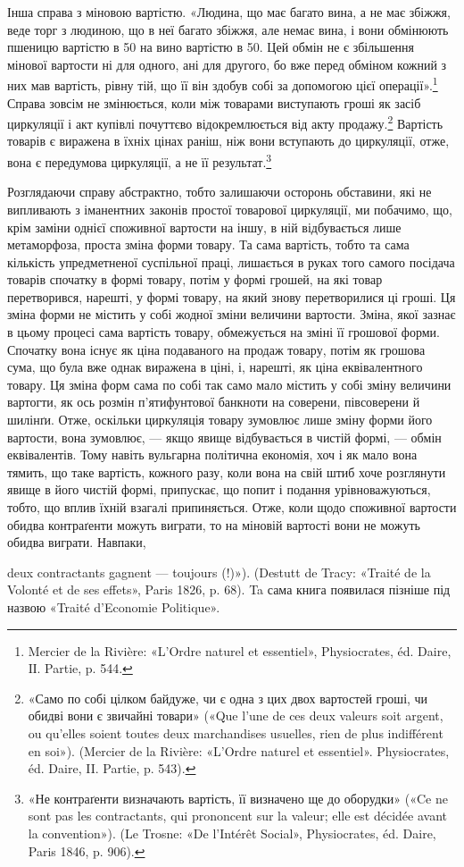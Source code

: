 Інша справа з міновою вартістю. «Людина, що має багато вина,
а не має збіжжя, веде торг з людиною, що в неї багато збіжжя,
але немає вина, і вони обмінюють пшеницю вартістю в 50 на
вино вартістю в 50. Цей обмін не є збільшення мінової вартости
ні для одного, ані для другого, бо вже перед обміном кожний
з них мав вартість, рівну тій, що її він здобув собі за допомогою
цієї операції».\footnote{
Mercier de la Rivière: «L’Ordre naturel et essentiel», Physiocrates, éd.
Daire, IІ. Partie, p. 544.
} Справа зовсім не змінюється, коли між товарами
виступають гроші як засіб циркуляції і акт купівлі почуттєво
відокремлюється від акту продажу.\footnote{
«Само по собі цілком байдуже, чи є одна з цих двох вартостей
гроші, чи обидві вони є звичайні товари» («Que l’une de ces deux valeurs
soit argent, ou qu’elles soient toutes deux marchandises usuelles, rien de
plus indifférent en soi»). (Mercier de la Rivière: «L’Ordre naturel et essentiel».
Physiocrates, éd. Daire, II. Partie, p. 543).
} Вартість товарів є виражена
в їхніх цінах раніш, ніж вони вступають до циркуляції, отже,
вона є передумова циркуляції, а не її результат.\footnote{
«Не контраґенти визначають вартість, її визначено ще до оборудки»
(«Ce ne sont pas les contractants, qui prononcent sur la valeur; elle est
décidée avant la convention»). (Le Trosne: «De l’Intérêt Social», Physiocrates,
éd. Daire, Paris 1846, p. 906).
}

Розглядаючи справу абстрактно, тобто залишаючи осторонь
обставини, які не випливають з іманентних законів простої товарової
циркуляції, ми побачимо, що, крім заміни однієї споживної
вартости на іншу, в ній відбувається лише метаморфоза, проста
зміна форми товару. Та сама вартість, тобто та сама кількість
упредметненої суспільної праці, лишається в руках того самого
посідача товарів спочатку в формі товару, потім у формі грошей,
на які товар перетворився, нарешті, у формі товару, на який
знову перетворилися ці гроші. Ця зміна форми не містить у собі
жодної зміни величини вартости. Зміна, якої зазнає в цьому процесі
сама вартість товару, обмежується на зміні її грошової
форми. Спочатку вона існує як ціна подаваного на продаж товару,
потім як грошова сума, що була вже однак виражена в ціні, і,
нарешті, як ціна еквівалентного товару. Ця зміна форм сама по
собі так само мало містить у собі зміну величини вартогти, як
ось розмін п’ятифунтової банкноти на соверени, півсоверени й
шилінґи. Отже, оскільки циркуляція товару зумовлює лише
зміну форми його вартости, вона зумовлює, — якщо явище відбувається
в чистій формі, — обмін еквівалентів. Тому навіть вульгарна
політична економія, хоч і як мало вона тямить, що таке
вартість, кожного разу, коли вона на свій штиб хоче розглянути
явище в його чистій формі, припускає, що попит і подання урівноважуються,
тобто, що вплив їхній взагалі припиняється. Отже,
коли щодо споживної вартости обидва контраґенти можуть виграти,
то на міновій вартості вони не можуть обидва виграти. Навпаки,

deux contractants gagnent — toujours (!)»). (Destutt de Tracy: «Traité de
la Volonté et de ses effets», Paris 1826, p. 68). Ta сама книга появилася пізніше
під назвою «Traité d’Economie Politique».